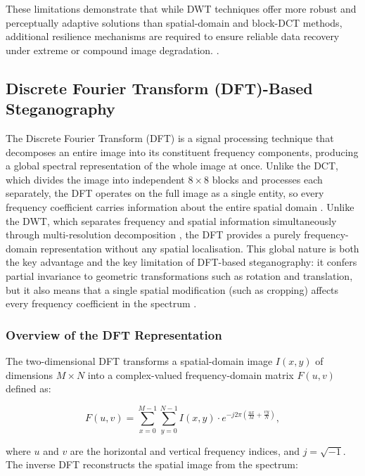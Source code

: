 \documentclass[12pt,a4paper,oneside]{report}
\begin{document}
	These limitations demonstrate that while DWT techniques offer more robust and perceptually adaptive solutions than spatial-domain and block-DCT methods, additional resilience mechanisms are required to ensure reliable data recovery under extreme or compound image degradation. \cite{cox2007digital}.
	
	\subsection{Discrete Fourier Transform (DFT)-Based Steganography}
	
	The Discrete Fourier Transform (DFT) is a signal processing technique that decomposes an
	entire image into its constituent frequency components, producing a global spectral
	representation of the whole image at once. Unlike the DCT, which divides the image into
	independent $8 \times 8$ blocks and processes each separately, the DFT operates on the full
	image as a single entity, so every frequency coefficient carries information about the entire
	spatial domain \cite{bracewell2000fourier}. Unlike the DWT, which separates frequency and
	spatial information simultaneously through multi-resolution decomposition \cite{mallat1999wavelet},
	the DFT provides a purely frequency-domain representation without any spatial localisation.
	This global nature is both the key advantage and the key limitation of DFT-based steganography:
	it confers partial invariance to geometric transformations such as rotation and translation,
	but it also means that a single spatial modification (such as cropping) affects every frequency
	coefficient in the spectrum \cite{ruanaidh1998rotation, petitcolas1999information}.
	
	\subsubsection{Overview of the DFT Representation}
	
	The two-dimensional DFT transforms a spatial-domain image $I(x,y)$ of dimensions
	$M \times N$ into a complex-valued frequency-domain matrix $F(u,v)$ defined as:
	
	\begin{equation}
		F(u,v) = \sum_{x=0}^{M-1} \sum_{y=0}^{N-1} I(x,y)\cdot
		e^{-j2\pi\!\left(\frac{ux}{M}+\frac{vy}{N}\right)},
		\label{eq:dft_forward}
	\end{equation}
	
	where $u$ and $v$ are the horizontal and vertical frequency indices, and
	$j = \sqrt{-1}$. The inverse DFT reconstructs the spatial image from the spectrum:
	
\end{document}
